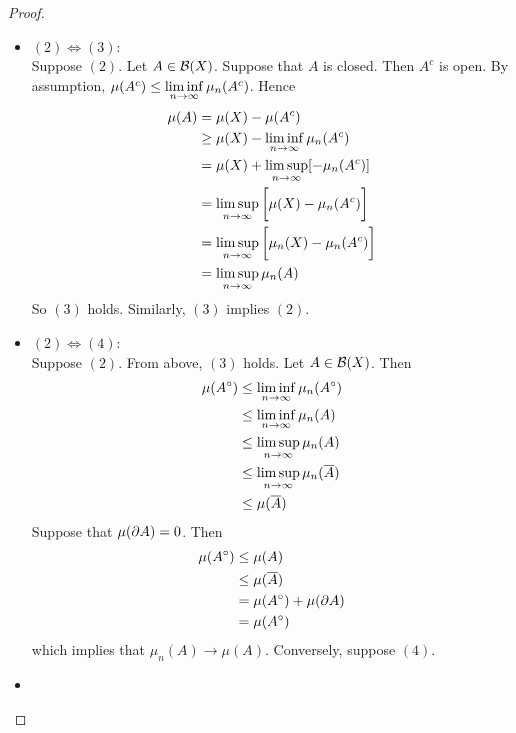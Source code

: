 \documentclass{book}
\begin{document}
	\begin{proof}\
		\begin{itemize}
			\item $(2) \iff (3)$: \\
			Suppose $(2)$. Let $A \in \mathcal{B}(X)$. Suppose that $A$ is closed. Then $A^c$ is open. By assumption, $\mu(A^c) \leq \liminf \limits_{n \rightarrow \infty} \limits \mu_n(A^c)$. Hence 
			\begin{align*}
				\mu(A)
				&= \mu(X) - \mu(A^c) \\
				&\geq \mu(X) - \liminf \limits_{n \rightarrow \infty} \mu_n(A^c) \\
				&= \mu(X) + \limsup \limits_{n \rightarrow \infty} [- \mu_n(A^c)] \\
				&= \limsup \limits_{n \rightarrow \infty} \bigg[ \mu(X)  - \mu_n(A^c) \bigg] \\
				&= \limsup \limits_{n \rightarrow \infty} \bigg[ \mu_n(X)  - \mu_n(A^c) \bigg] \\
				&= \limsup \limits_{n \rightarrow \infty} \mu_n(A)
			\end{align*}
			So $(3)$ holds.
			Similarly, $(3)$ implies $(2)$.\\
			\item $(2) \iff (4)$: \\
			Suppose $(2)$. From above, $(3)$ holds. Let $A \in \mathcal{B}(X)$. Then 
			\begin{align*}
				\mu(A^{\circ}) 
				& \leq \liminf \limits_{n \rightarrow \infty} \mu_n(A^{\circ}) \\
				& \leq  \liminf \limits_{n \rightarrow \infty} \mu_n(A) \\
				& \leq  \limsup \limits_{n \rightarrow \infty} \mu_n(A) \\
				& \leq  \limsup \limits_{n \rightarrow \infty} \mu_n(\overline{A}) \\
				& \leq  \mu(\overline{A}) \\
			\end{align*}
			Suppose that $\mu(\partial A) = 0$. Then
			\begin{align*}
				\mu(A^{\circ}) 
				&\leq \mu(A) \\
				& \leq \mu(\overline{A}) \\
				&= \mu(A^{\circ}) + \mu(\partial A) \\
				&= \mu(A^{\circ}) \\
			\end{align*}
			which implies that $\mu_n(A) \rightarrow \mu(A)$. Conversely, suppose $(4)$. 
			\item 
		\end{itemize}
	\end{proof}
\end{document}
